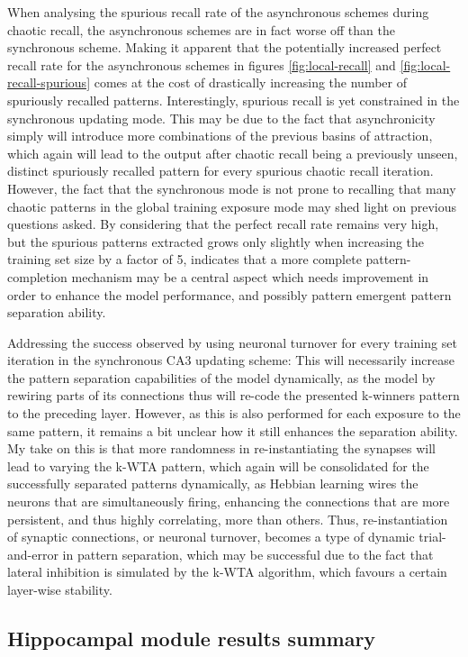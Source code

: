 When analysing the spurious recall rate of the asynchronous schemes during chaotic recall, the asynchronous schemes are in fact worse off than the synchronous scheme. Making it apparent that the potentially increased perfect recall rate for the asynchronous schemes in figures \ref{fig:local-recall} and \ref{fig:local-recall-spurious} comes at the cost of drastically increasing the number of spuriously recalled patterns. Interestingly, spurious recall is yet constrained in the synchronous updating mode. This may be due to the fact that asynchronicity simply will introduce more combinations of the previous basins of attraction, which again will lead to the output after chaotic recall being a previously unseen, distinct spuriously recalled pattern for every spurious chaotic recall iteration. However, the fact that the synchronous mode is not prone to recalling that many chaotic patterns in the global training exposure mode may shed light on previous questions asked. By considering that the perfect recall rate remains very high, but the spurious patterns extracted grows only slightly when increasing the training set size by a factor of 5, indicates that a more complete pattern-completion mechanism may be a central aspect which needs improvement in order to enhance the model performance, and possibly pattern emergent pattern separation ability.

Addressing the success observed by using neuronal turnover for every training set iteration in the synchronous CA3 updating scheme: 
This will necessarily increase the pattern separation capabilities of the model dynamically, as the model by rewiring parts of its connections thus will re-code the presented k-winners pattern to the preceding layer. However, as this is also performed for each exposure to the same pattern, it remains a bit unclear how it still enhances the separation ability. My take on this is that more randomness in re-instantiating the synapses will lead to varying the k-WTA pattern, which again will be consolidated for the successfully separated patterns dynamically, as Hebbian learning wires the neurons that are simultaneously firing, enhancing the connections that are more persistent, and thus highly correlating, more than others. Thus, re-instantiation of synaptic connections, or neuronal turnover, becomes a type of dynamic trial-and-error in pattern separation, which may be successful due to the fact that lateral inhibition is simulated by the k-WTA algorithm, which favours a certain layer-wise stability.

\subsection{Hippocampal module results summary}

